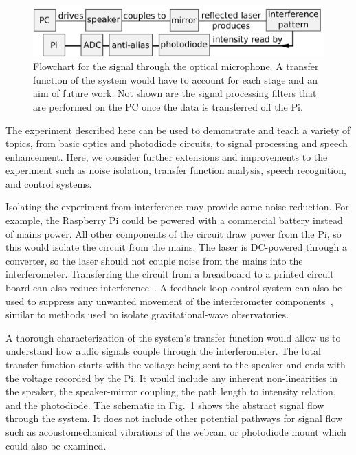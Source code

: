 \documentclass[paper-main.tex]{subfiles}
\begin{document}
\begin{figure}
    \includegraphics[width=.8\textwidth]{figures/pipeline_nobox.pdf}
	\caption{\label{fig:pipeline_highlighted}
Flowchart for the signal through the optical microphone. 
A transfer function of the system would have to account for each stage and an aim of future work. 
Not shown are the signal processing filters that are performed on the PC once the data is transferred off the Pi.
}
\end{figure}

The experiment described here can be used to demonstrate and teach a variety of topics, from basic optics and photodiode circuits, to signal processing and speech enhancement. 
Here, we consider further extensions and improvements to the experiment such as noise isolation, transfer function analysis, speech recognition, and control systems.


Isolating the experiment from interference may provide some noise reduction. 
For example, the Raspberry Pi could be powered with a commercial battery instead of mains power. 
All other components of the circuit draw power from the Pi, so this would isolate the circuit from the mains. 
The laser is DC-powered through a converter, so the laser should not couple noise from the mains into the interferometer. 
Transferring the circuit from a breadboard to a printed circuit board can also reduce interference~\cite{elfekey2013design}.
A feedback loop control system can also be used to suppress any unwanted movement of the interferometer components~\citep{abbott2017exploring, Sekiguchi:2016bmv, verhoeven2009robust}, similar to methods used to isolate gravitational-wave observatories. 


A thorough characterization of the system's transfer function would allow us to understand how audio signals couple through the interferometer. 
The total transfer function starts with the voltage being sent to the speaker and ends with the voltage recorded by the Pi. 
It would include any inherent non-linearities in the speaker, the speaker-mirror coupling, the path length to intensity relation, and the photodiode. 
The schematic in Fig.~\ref{fig:pipeline_highlighted} shows the abstract signal flow through the system.
It does not include other potential pathways for signal flow such as acoustomechanical vibrations of the webcam or photodiode mount which could also be examined.
\end{document}
